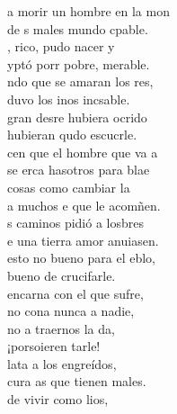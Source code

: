 \documentclass[12pt]{article}
\begin{document}
\begin{multicols*}{2}
\begin{cancion}%
	 a morir un hombre en la mon\\
	de s males  mundo cpable. \\
	, rico, pudo nacer y \\
	yptó porr pobre, merable.\\
	ndo que se amaran los res,\\
	duvo los inos incsable.\\
	gran desre hubiera ocrido\\
	 hubieran qudo escucrle.\\
	cen que el hombre que va a \\
	se erca hasotros para blae\\
	 cosas como cambiar la \\
	a muchos e que le acomñen.\\
	s caminos pidió a losbres\\
	e una tierra amor anuiasen.\\
	 esto no bueno para el eblo,\\
	 bueno de crucifarle.\\
	 encarna con el que sufre,\\
	no cona nunca a nadie,\\
	no a traernos la da,\\
	¡porsoieren tarle!\\
	lata a los engreídos,\\
	cura as que tienen males.\\
	de vivir como lios,\\

\end{cancion}
\end{multicols*}
\end{document}
